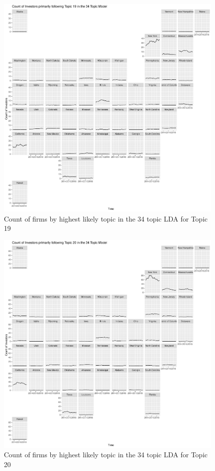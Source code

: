 		\begin{figure}
		\centering
		\includegraphics[width=1\linewidth]{Figures/ChapterV/USA_34_Topic19.pdf}
		\caption[Count of firm for Topic 19 by quarter]{Count of firms by highest likely topic in the 34 topic LDA for Topic 19}
		\label{fig:StateLDA20}
	\end{figure}
	
		\begin{figure}
		\centering
		\includegraphics[width=1\linewidth]{Figures/ChapterV/USA_34_Topic20.pdf}
		\caption[Count of firm for Topic 20 by quarter]{Count of firms by highest likely topic in the 34 topic LDA for Topic 20}
		\label{fig:StateLDA20}
	\end{figure}
	
